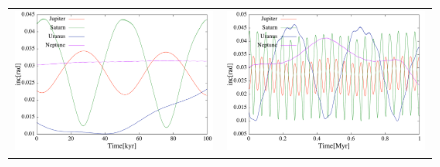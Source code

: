 \documentclass[11pt,a4paper,oneside,onecolumn]{jarticle}
\begin{document}
\begin{figure}[H]
\begin{tabular}{cc}
\begin{minipage}[t]{0.45\hsize}
\centering
\includegraphics[width=7.6cm]{./image/Nomove_inc_100kyr.pdf}
\end{minipage} &
\begin{minipage}[t]{0.45\hsize}
\centering
\includegraphics[width=7.6cm]{./image/Nomove_inc_1Myr.pdf}
\end{minipage}
%
\end{tabular}
\caption{\label{}}
\end{figure}
\end{document}
